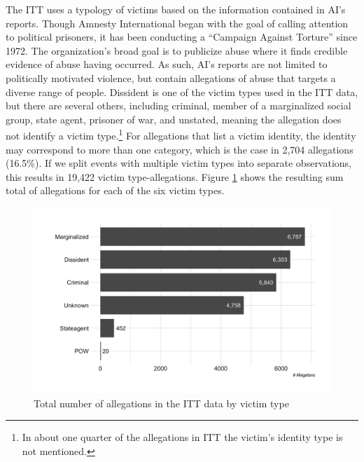 \documentclass[11pt]{article}
\begin{document}
The ITT uses a typology of victims based on the information contained in AI's reports. Though Amnesty International began with the goal of calling attention to political prisoners, it has been conducting a ``Campaign Against Torture'' since 1972. The organization's broad goal is to publicize abuse where it finds credible evidence of abuse having occurred. As such, AI's reports are not limited to politically motivated violence, but contain allegations of abuse that targets a diverse range of people. Dissident is one of the victim types used in the ITT data, but there are several others, including criminal, member of a marginalized social group, state agent, prisoner of war, and unstated, meaning the allegation does not identify a victim type.\footnote{In about one quarter of the allegations in ITT the victim's identity type is not mentioned.} For allegations that list a victim identity, the identity may correspond to more than one category, which is the case in 2,704 allegations (16.5\%). If we split events with multiple victim types into separate observations, this results in 19,422 victim type-allegations. Figure \ref{fig:victim-types} shows the resulting sum total of allegations for each of the six victim types. 

\begin{figure}
\begin{center}
\caption{Total number of allegations in the ITT data by victim type}
\label{fig:victim-types}
\includegraphics[width=.75\textwidth]{../output/figures/allegations-by-victim.png}
\end{center}
\end{figure}
\end{document}
